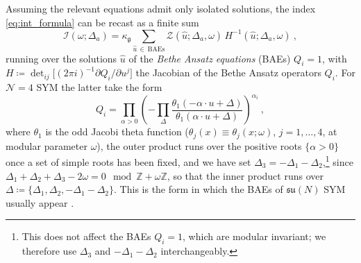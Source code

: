 \documentclass[aps, prx, nofootinbib, twocolumn,amsfonts,amsmath,amssymb,mathtools,superscriptaddress,preprintnumbers,floatfix,reprint]{revtex4-2}
\newcommand{\alg}{\mathfrak{g}}
\begin{document}
Assuming the relevant equations admit only isolated solutions, the index
\eqref{eq:int_formula} can be recast as a finite sum
\cite{Closset:2017bse,Benini:2018mlo}
\begin{equation}\label{eq:BAformula}
  \mathcal{I}(\omega;\Delta_a)=\kappa_\alg
  \sum_{\hat u\,\in\,\text{BAEs}}\mathcal{Z}(\hat u;\Delta_a,\omega)\,
  H^{-1}(\hat u;\Delta_a,\omega)\ ,
\end{equation}
running over the solutions $\hat u$ of the \emph{Bethe Ansatz equations} (BAEs)
$Q_i=1$, with
$H\coloneqq\det_{ij}\big[(2\pi i)^{-1}\partial Q_i/\partial u^j\big]$ the
Jacobian of the Bethe Ansatz operators $Q_i$. For $\mathcal{N}=4$ SYM the latter
take the form
\begin{equation}\label{eq:theta1_BAE}
  Q_i=\prod_{\alpha>0}\left(-\prod_{\Delta}\frac{\theta_1(-\alpha\cdot u+\Delta)}
  {\theta_1(\alpha\cdot u+\Delta)}\right)^{\alpha_i}\ ,
\end{equation}
where $\theta_1$ is the odd Jacobi theta function
($\theta_j(x)\equiv\theta_j(x;\omega)$, $j=1,\dots,4$, at modular parameter
$\omega$), the outer product runs over the positive roots $\{\alpha>0\}$ once a set of
simple roots has been fixed, and we have set $\Delta_3=-\Delta_1-\Delta_2$,\footnote{This does not affect the BAEs $Q_i=1$,
which are modular invariant; we therefore use $\Delta_3$ and
$-\Delta_1-\Delta_2$ interchangeably.}
since $\Delta_1+\Delta_2+\Delta_3-2\omega=0 \mod
\mathbb{Z}+\omega\mathbb{Z}$, so that the inner product runs over $\Delta \coloneqq \{ \Delta_1,\Delta_2,-\Delta_1-\Delta_2\}$. This is the form in which the BAEs of
$\mathfrak{su}(N)$ SYM usually appear \cite{Benini:2018ywd}.
\end{document}
